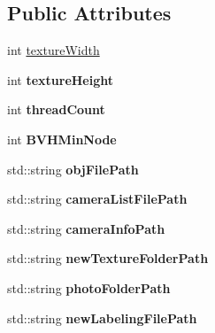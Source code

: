 \subsection*{Public Attributes}
\begin{DoxyCompactItemize}
\item 
int \hyperlink{struct_arguments_a53b1eb430f4ea67ffd9a85696a295cd0}{texture\+Width}
\item 
\hypertarget{struct_arguments_acba64f044d4603abac85ba2cf1b50b75}{}int {\bfseries texture\+Height}\label{struct_arguments_acba64f044d4603abac85ba2cf1b50b75}

\item 
\hypertarget{struct_arguments_a81212a8036b56467011fb90c075ec4d8}{}int {\bfseries thread\+Count}\label{struct_arguments_a81212a8036b56467011fb90c075ec4d8}

\item 
\hypertarget{struct_arguments_a90c008ddccf9fc27fc1e7db34b51b36e}{}int {\bfseries B\+V\+H\+Min\+Node}\label{struct_arguments_a90c008ddccf9fc27fc1e7db34b51b36e}

\item 
\hypertarget{struct_arguments_a5615cc24abc162c63ef3aedc135b0db4}{}std\+::string {\bfseries obj\+File\+Path}\label{struct_arguments_a5615cc24abc162c63ef3aedc135b0db4}

\item 
\hypertarget{struct_arguments_a033abba738ba0403e87f883cc203d618}{}std\+::string {\bfseries camera\+List\+File\+Path}\label{struct_arguments_a033abba738ba0403e87f883cc203d618}

\item 
\hypertarget{struct_arguments_a1efe0a7268bb4ab28a51566a13c5f36b}{}std\+::string {\bfseries camera\+Info\+Path}\label{struct_arguments_a1efe0a7268bb4ab28a51566a13c5f36b}

\item 
\hypertarget{struct_arguments_aacc8cf735f8d2793e4fbd81d05f22918}{}std\+::string {\bfseries new\+Texture\+Folder\+Path}\label{struct_arguments_aacc8cf735f8d2793e4fbd81d05f22918}

\item 
\hypertarget{struct_arguments_a784aabe9dd9bbeb828d1ad845b72887c}{}std\+::string {\bfseries photo\+Folder\+Path}\label{struct_arguments_a784aabe9dd9bbeb828d1ad845b72887c}

\item 
\hypertarget{struct_arguments_a4a043101d13a6c0540f501af85a691ce}{}std\+::string {\bfseries new\+Labeling\+File\+Path}\label{struct_arguments_a4a043101d13a6c0540f501af85a691ce}


\end{DoxyCompactItemize}

